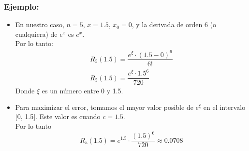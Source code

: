 \documentclass[10pt]{beamer}
\begin{document}
\begin{frame}
\frametitle{Ejemplo:}
 \begin{itemize}
   \item<1-> En nuestro caso, $n = 5$, $x = 1.5$, $x_0 = 0$, y la derivada de orden 6 (o cualquiera) de $e^x$ es $e^x$.\\
   Por lo tanto:
   $$
   \begin{array}{l}
   R_5(1.5) = \dfrac{e^\xi \cdot (1.5 - 0)^6}{6!}\\[10pt]
   R_5(1.5) = \dfrac{e^\xi \cdot 1.5^6}{720} 
   \end{array}
   $$
   Donde $\xi$ es un n\'umero entre 0 y 1.5.
   \item<2-> Para maximizar el error, tomamos el mayor valor posible de $e^\xi$ en el intervalo [0, 1.5]. Este valor es cuando $c=1.5$.\\
Por lo tanto
$$
R_5(1.5) = e^{1.5} \cdot \dfrac{(1.5)^6}{720} \approx 0.0708
$$
 \end{itemize}
\end{frame}
\end{document}
